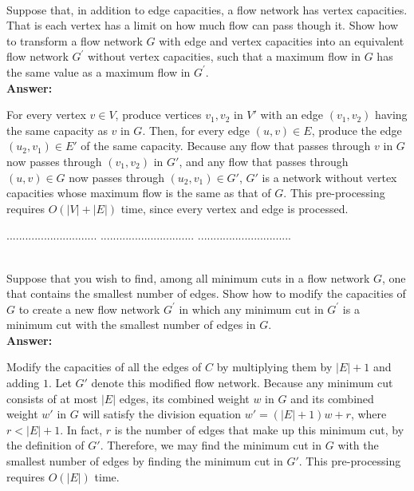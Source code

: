 \documentclass[a4paper,11pt]{article}
\begin{document}
\\
Suppose that, in addition to edge capacities, a flow network has vertex capacities.
That is each vertex has a limit on how much flow can pass though it. Show
how to transform a flow network $G$ with edge and vertex capacities into an equivalent
flow network $G^\prime$  without vertex capacities, such that a maximum
flow in $G$ has the same value as a maximum flow in $G^\prime$.\\
{\bf Answer:} \par
For every vertex $v \in V$, produce vertices $v_1, v_2$ in $V'$ with an edge $(v_1, v_2)$ having the same capacity as $v$ in $G$. Then, for every edge $(u, v) \in E$, produce the edge $(u_2, v_1) \in E'$ of the same capacity. Because any flow that passes through $v$ in $G$ now passes through $(v_1, v_2)$ in $G'$, and any flow that passes through $(u, v) \in G$ now passes through $(u_2, v_1) \in G'$, $G'$ is a network without vertex capacities whose maximum flow is the same as that of $G$. This pre-processing requires $O(|V| + |E|)$ time, since every vertex and edge is processed.

\pagebreak

 $.............................$
 $..............................$
          $..............................$\\

\bigskip

\\
Suppose that you wish to find, among all minimum cuts in a flow network $G$, one
that contains the smallest number of edges. Show how to modify the capacities
of $G$ to create a new flow network $G^\prime$ in which any minimum cut in $G^\prime$ is a minimum cut with the smallest number of edges in $G$.\\
{\bf Answer:} \par
Modify the capacities of all the edges of $C$ by multiplying them by $|E| + 1$ and adding $1$. Let $G'$ denote this modified flow network. Because any minimum cut consists of at most $|E|$ edges, its combined weight $w$ in $G$ and its combined weight $w'$ in $G$ will satisfy the division equation $w' = (|E| + 1)w + r$, where $r < |E| + 1$. In fact, $r$ is the number of edges that make up this minimum cut, by the definition of $G'$. Therefore, we may find the minimum cut in $G$ with the smallest number of edges by finding the minimum cut in $G'$. This pre-processing requires $O(|E|)$ time.
\end{document}
